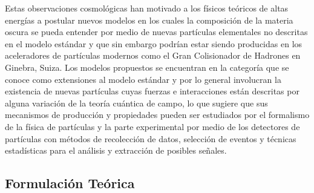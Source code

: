 Estas observaciones cosmológicas han motivado a los físicos teóricos de altas energías a postular nuevos modelos en los cuales la composición de la materia oscura se pueda entender por medio de nuevas partículas elementales no descritas en el modelo estándar y que sin embargo podrían estar siendo producidas en los aceleradores de partículas modernos como el Gran Colisionador de Hadrones en Ginebra, Suiza. Los modelos propuestos se encuentran en la categoría que se conoce como extensiones al modelo estándar y por lo general involucran la existencia de nuevas partículas cuyas fuerzas e interacciones están descritas por alguna variación de la teoría cuántica de campo, lo que sugiere que sus mecanismos de producción y propiedades pueden ser estudiados por el formalismo de la física de partículas y la parte experimental por medio de los detectores de partículas con métodos de recolección de datos, selección de eventos y técnicas estadísticas para el análisis y extracción de posibles señales.

\subsection{Formulación Teórica}












